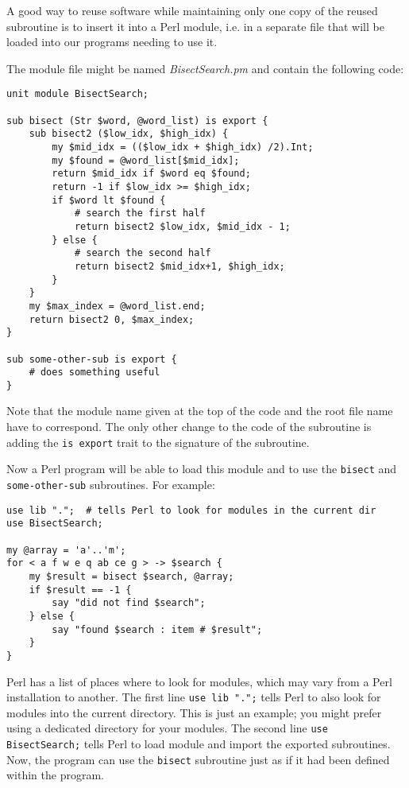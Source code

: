 A good way to reuse software while maintaining only 
one copy of the reused subroutine is to insert it into 
a Perl module, i.e. in a separate file that will be 
loaded into our programs needing to use it.

The module file might be named \emph{BisectSearch.pm} 
and contain the following code:

\begin{verbatim}
unit module BisectSearch;

sub bisect (Str $word, @word_list) is export {
    sub bisect2 ($low_idx, $high_idx) {
        my $mid_idx = (($low_idx + $high_idx) /2).Int;
        my $found = @word_list[$mid_idx];
        return $mid_idx if $word eq $found;
        return -1 if $low_idx >= $high_idx;
        if $word lt $found {
            # search the first half
            return bisect2 $low_idx, $mid_idx - 1;
        } else {
            # search the second half
            return bisect2 $mid_idx+1, $high_idx;
        }
    }
    my $max_index = @word_list.end;
    return bisect2 0, $max_index;
}

sub some-other-sub is export {
    # does something useful
}
\end{verbatim}

Note that the module name given at the top of the code 
and the root file name have to correspond. The only other 
change to the code of the subroutine is adding the 
{\tt is export} trait to the signature of the subroutine.

Now a Perl program will be able to load this module 
and to use the {\tt bisect} and {\tt some-other-sub} 
subroutines. For example:
\begin{verbatim}
use lib ".";  # tells Perl to look for modules in the current dir
use BisectSearch;

my @array = 'a'..'m';
for < a f w e q ab ce g > -> $search { 
    my $result = bisect $search, @array;
    if $result == -1 {
        say "did not find $search";
    } else {
        say "found $search : item # $result";
    }
}
\end{verbatim}
%

Perl has a list of places where to look for modules, 
which may vary from a Perl installation to another. 
The first line {\tt use lib ".";} tells Perl to also 
look for modules into the current directory. This is 
just an example; you might prefer using a dedicated 
directory for your modules. The 
second line {\tt use BisectSearch;} tells Perl to 
load module and import the exported subroutines. Now, 
the program can use the {\tt bisect} subroutine just as if 
it had been defined within the program.

